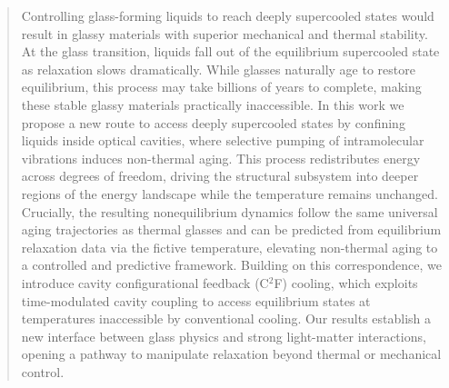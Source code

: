 \documentclass[aps, prl,
 reprint,
 superscriptaddress,
 citeautoscript,  %
 amsmath,amssymb,
 tightenlines
]{revtex4-2}
\begin{document}
\begin{abstract}

Controlling glass-forming liquids to reach deeply supercooled states would result in glassy materials with superior mechanical and thermal stability. 
At the glass transition, liquids fall out of the equilibrium supercooled state as relaxation slows dramatically. While glasses naturally age to restore equilibrium, this process may take billions of years to complete, making these stable glassy materials practically inaccessible.
In this work we propose a new route to access deeply supercooled states by confining liquids inside optical cavities, where selective pumping of intramolecular vibrations induces non-thermal aging. This process redistributes energy across degrees of freedom, driving the structural subsystem into deeper regions of the energy landscape while the temperature remains unchanged. Crucially, the resulting nonequilibrium dynamics follow the same universal aging trajectories as thermal glasses and can be predicted from equilibrium relaxation data via the fictive temperature, elevating non-thermal aging to a controlled and predictive framework. Building on this correspondence, we introduce cavity configurational feedback (C$^2$F) cooling, which exploits time-modulated cavity coupling to access equilibrium states at temperatures inaccessible by conventional cooling. Our results establish a new interface between glass physics and strong light-matter interactions, opening a pathway to manipulate relaxation beyond thermal or mechanical control.



\end{abstract}
\end{document}
